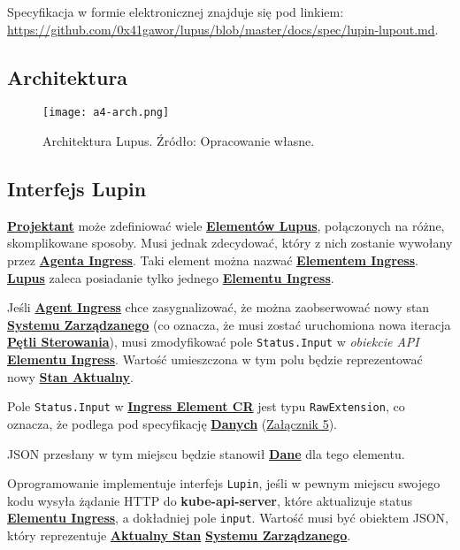 \label{appendix:4}

Specyfikacja w formie elektronicznej znajduje się pod linkiem: \url{https://github.com/0x41gawor/lupus/blob/master/docs/spec/lupin-lupout.md}.

\subsection{Architektura}

\begin{figure}[!h]
    \centering \texttt{[image: a4-arch.png]}
    \caption{Architektura Lupus. Źródło: Opracowanie własne.}\label{fig:a4-arch}
\end{figure}

\subsection{Interfejs Lupin}

\hyperlink{def:projektant}{\textbf{Projektant}} może zdefiniować wiele \hyperlink{def:element-lupus}{\textbf{Elementów Lupus}}, połączonych na różne, skomplikowane sposoby. Musi jednak zdecydować, który z nich zostanie wywołany przez \hyperlink{def:agent-ingress}{\textbf{Agenta Ingress}}. Taki element można nazwać \hyperlink{def:element-ingres}{\textbf{Elementem Ingress}}. \hyperlink{def:lupus}{\textbf{Lupus}} zaleca posiadanie tylko jednego \hyperlink{def:element-ingres}{\textbf{Elementu Ingress}}.

Jeśli \hyperlink{def:agent-ingress}{\textbf{Agent Ingress}} chce zasygnalizować, że można zaobserwować nowy stan \hyperlink{def:system-zarzadzany}{\textbf{Systemu Zarządzanego}} (co oznacza, że musi zostać uruchomiona nowa iteracja \hyperlink{def:zamknieta-petla-sterowania}{\textbf{Pętli Sterowania}}), musi zmodyfikować pole \texttt{Status.Input} w \textit{obiekcie API} \hyperlink{def:element-ingres}{\textbf{Elementu Ingress}}. Wartość umieszczona w tym polu będzie reprezentować nowy \hyperlink{def:stan-aktualny}{\textbf{Stan Aktualny}}.

Pole \texttt{Status.Input} w \hyperlink{def:element-ingres}{\textbf{Ingress Element CR}} jest typu \texttt{RawExtension}, co oznacza, że podlega pod specyfikację \hyperlink{def:dane}{\textbf{Danych}} (\hyperref[appendix:5]{Załącznik 5}).

JSON przesłany w tym miejscu będzie stanowił \hyperlink{def:dane}{\textbf{Dane}} dla tego elementu.

Oprogramowanie implementuje interfejs \texttt{Lupin}, jeśli w pewnym miejscu swojego kodu wysyła żądanie HTTP do \textbf{kube-api-server}, które aktualizuje status \hyperlink{def:element-ingres}{\textbf{Elementu Ingress}}, a dokładniej pole \texttt{input}. Wartość musi być obiektem JSON, który reprezentuje \hyperlink{def:stan-aktualny}{\textbf{Aktualny Stan}} \hyperlink{def:system-zarzadzany}{\textbf{Systemu Zarządzanego}}. 

